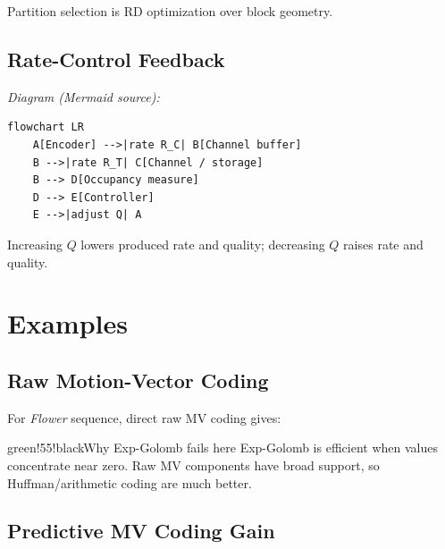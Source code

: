 Partition selection is RD optimization over block geometry.

\subsection{Rate-Control Feedback}

\begin{center}\footnotesize\itshape Diagram (Mermaid source):\end{center}
\begin{verbatim}
flowchart LR
    A[Encoder] -->|rate R_C| B[Channel buffer]
    B -->|rate R_T| C[Channel / storage]
    B --> D[Occupancy measure]
    D --> E[Controller]
    E -->|adjust Q| A
\end{verbatim}

Increasing $Q$ lowers produced rate and quality; decreasing $Q$ raises rate and quality.

\section{Examples}

\subsection{Raw Motion-Vector Coding}

For \textit{Flower} sequence, direct raw MV coding gives:

\begin{center}
\end{center}

\begin{calloutbox}{green!55!black}{Why Exp-Golomb fails here}
Exp-Golomb is efficient when values concentrate near zero. Raw MV components have broad support, so Huffman/arithmetic coding are much better.
\end{calloutbox}

\subsection{Predictive MV Coding Gain}

